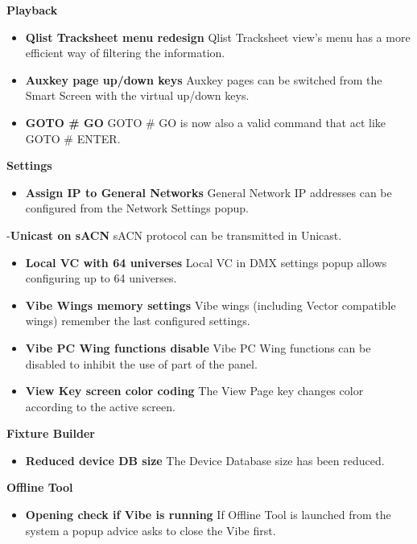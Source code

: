 \documentclass[
]{article}
\providecommand{\tightlist}{%
  \setlength{\itemsep}{0pt}\setlength{\parskip}{0pt}}
\begin{document}
\textbf{Playback}

\begin{itemize}
\item
  \textbf{Qlist Tracksheet menu redesign} Qlist Tracksheet view's menu has a more efficient way of filtering the information.
\item
  \textbf{Auxkey page up/down keys} Auxkey pages can be switched from the Smart Screen with the virtual up/down keys.
\item
  \textbf{GOTO \# GO} GOTO \# GO is now also a valid command that act like GOTO \# ENTER.
\end{itemize}

\textbf{Settings}

\begin{itemize}
\tightlist
\item
  \textbf{Assign IP to General Networks} General Network IP addresses can be configured from the Network Settings popup.
\end{itemize}

-\textbf{Unicast on sACN} sACN protocol can be transmitted in Unicast.

\begin{itemize}
\item
  \textbf{Local VC with 64 universes} Local VC in DMX settings popup allows configuring up to 64 universes.
\item
  \textbf{Vibe Wings memory settings} Vibe wings (including Vector compatible wings) remember the last configured settings.
\item
  \textbf{Vibe PC Wing functions disable} Vibe PC Wing functions can be disabled to inhibit the use of part of the panel.
\item
  \textbf{View Key screen color coding} The View Page key changes color according to the active screen.
\end{itemize}

\textbf{Fixture Builder}

\begin{itemize}
\tightlist
\item
  \textbf{Reduced device DB size} The Device Database size has been reduced.
\end{itemize}

\textbf{Offline Tool}

\begin{itemize}
\tightlist
\item
  \textbf{Opening check if Vibe is running} If Offline Tool is launched from the system a popup advice asks to close the Vibe first.
\end{itemize}
\end{document}
